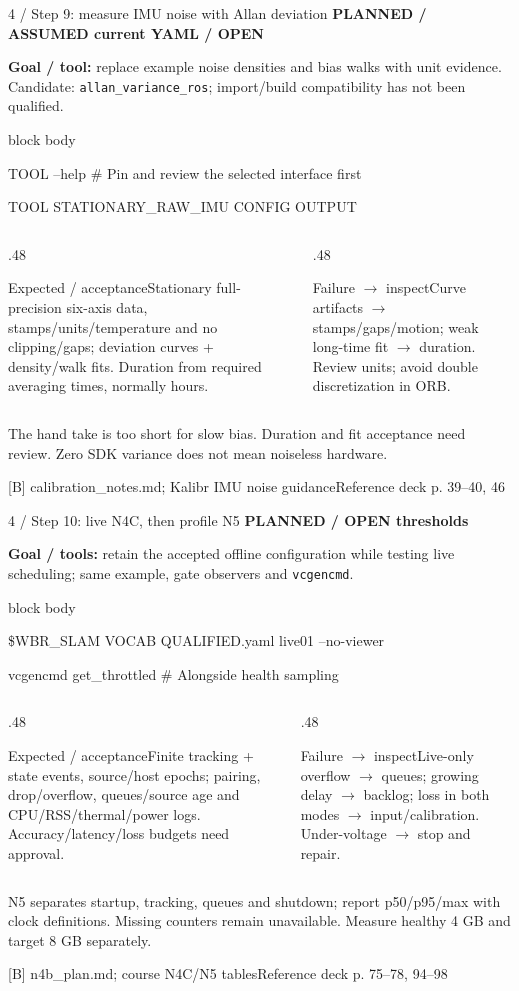 \documentclass[aspectratio=169,12pt,t]{beamer}
\newcommand{\evidence}[1]{{\small\bfseries\color{teal!70!black}#1}\par\medskip}
\newcommand{\src}[2]{\vfill\par{\footnotesize\color{muted}#1\quad Reference deck p. #2}\par}
\newcommand{\code}[1]{\par\smallskip\begin{beamercolorbox}[wd=\linewidth,sep=2mm]{block body}{\ttfamily\small #1}\end{beamercolorbox}\par\smallskip}
\newcommand{\pair}[4]{\begin{columns}[T,onlytextwidth]\begin{column}{.48\textwidth}\begin{block}{#1}#2\end{block}\end{column}\begin{column}{.48\textwidth}\begin{block}{#3}#4\end{block}\end{column}\end{columns}}
\begin{document}
\begin{frame}{4 / Step 9: measure IMU noise with Allan deviation}
\evidence{PLANNED / ASSUMED current YAML / OPEN}

\textbf{Goal / tool:} replace example noise densities and bias walks with unit evidence. Candidate: \texttt{allan\_variance\_ros}; import/build compatibility has not been qualified.
\code{TOOL --help \quad\# Pin and review the selected interface first\par TOOL STATIONARY\_RAW\_IMU CONFIG OUTPUT}
\pair{Expected / acceptance}{Stationary full-precision six-axis data, stamps/units/temperature and no clipping/gaps; deviation curves + density/walk fits. Duration from required averaging times, normally hours.}{Failure $\to$ inspect}{Curve artifacts $\to$ stamps/gaps/motion; weak long-time fit $\to$ duration. Review units; avoid double discretization in ORB.}
\medskip The hand take is too short for slow bias. Duration and fit acceptance need review. Zero SDK variance does not mean noiseless hardware.

\src{[B] calibration\_notes.md; Kalibr IMU noise guidance}{39--40, 46}
\end{frame}

\begin{frame}{4 / Step 10: live N4C, then profile N5}
\evidence{PLANNED / OPEN thresholds}

\textbf{Goal / tools:} retain the accepted offline configuration while testing live scheduling; same example, gate observers and \texttt{vcgencmd}.
\code{\$WBR\_SLAM VOCAB QUALIFIED.yaml live01 --no-viewer\par vcgencmd get\_throttled \quad\# Alongside health sampling}
\pair{Expected / acceptance}{Finite tracking + state events, source/host epochs; pairing, drop/overflow, queues/source age and CPU/RSS/thermal/power logs. Accuracy/latency/loss budgets need approval.}{Failure $\to$ inspect}{Live-only overflow $\to$ queues; growing delay $\to$ backlog; loss in both modes $\to$ input/calibration. Under-voltage $\to$ stop and repair.}
\medskip N5 separates startup, tracking, queues and shutdown; report p50/p95/max with clock definitions. Missing counters remain unavailable. Measure healthy 4 GB and target 8 GB separately.

\src{[B] n4b\_plan.md; course N4C/N5 tables}{75--78, 94--98}
\end{frame}
\end{document}
